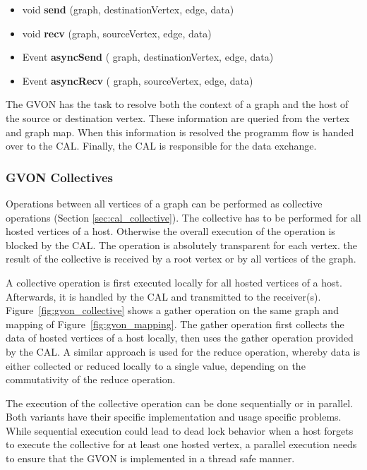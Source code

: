 \begin{itemize}
  \item  void \textbf{send} (graph, destinationVertex, edge, data)
  \item  void \textbf{recv} (graph, sourceVertex, edge, data)
  \item  Event \textbf{asyncSend} ( graph, destinationVertex, edge, data)
  \item  Event \textbf{asyncRecv} ( graph, sourceVertex, edge, data)
\end{itemize}

\noindent The GVON has the task to resolve both the context of a graph
and the host of the source or destination vertex. These information are
queried from the vertex and graph map. When this information is
resolved the programm flow is handed over to the CAL. Finally, the CAL
is responsible for the data exchange.

\subsubsection*{GVON Collectives}
\label{sec:design:gvon_collectives}
Operations between all vertices of a graph can be performed as
collective operations (Section \ref{sec:cal_collective}).  The
collective has to be performed for all hosted vertices of a
host. Otherwise the overall execution of the operation is blocked by
the CAL. The operation is absolutely transparent for each vertex.  the
result of the collective is received by a root vertex or by all
vertices of the graph.

A collective operation is first executed locally for all hosted
vertices of a host. Afterwards, it is handled by the CAL and
transmitted to the receiver(s). Figure~\ref{fig:gvon_collective} shows
a gather operation on the same graph and mapping of
Figure~\ref{fig:gvon_mapping}.  The gather operation first collects
the data of hosted vertices of a host locally, then uses the gather
operation provided by the CAL.  A similar approach is used for the
reduce operation, whereby data is either collected or reduced locally
to a single value, depending on the commutativity of the reduce
operation.

The execution of the collective operation can be done sequentially or in
parallel. Both variants have their specific implementation and usage
specific problems. While sequential execution could lead to dead lock behavior
when a host forgets to execute the collective for at least one hosted vertex,
a parallel execution needs to ensure that the GVON is implemented in
a thread safe manner.

